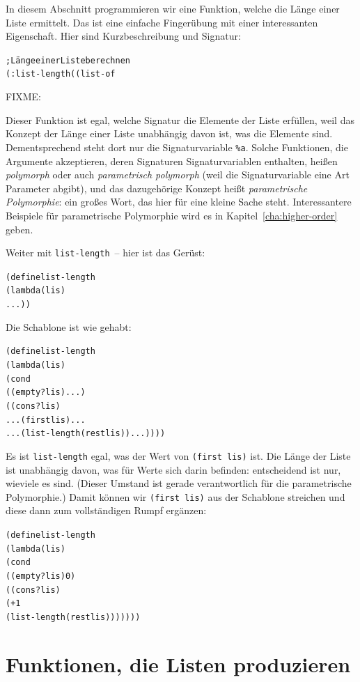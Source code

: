 In diesem Abschnitt programmieren wir eine Funktion, welche die Länge
einer Liste ermittelt. Das ist
eine einfache Fingerübung mit einer interessanten Eigenschaft.  Hier
sind Kurzbeschreibung und Signatur:
%
\begin{alltt}
; Länge einer Liste berechnen
(: list-length ((list-of %
\end{alltt}
%
FIXME:

Dieser Funktion ist egal, welche Signatur
die Elemente der Liste erfüllen, weil das Konzept der Länge einer
Liste unabhängig davon ist, was die Elemente sind.
Dementsprechend steht dort nur die Signaturvariable \verb|%a|.
Solche Funktionen, die Argumente akzeptieren, deren Signaturen
Signaturvariablen enthalten, heißen \textit{polymorph} oder auch
\textit{parametrisch polymorph} (weil die Signaturvariable eine Art
Parameter abgibt), und das dazugehörige Konzept heißt
\textit{parametrische
  Polymorphie}:
ein großes Wort, das hier für eine kleine Sache steht.  Interessantere
Beispiele für parametrische Polymorphie wird es in
Kapitel~\ref{cha:higher-order} geben.

Weiter mit \texttt{list-length}~-- hier ist das Gerüst:
%
\begin{alltt}
(define list-length
  (lambda (lis)
    ...))
\end{alltt}
%
Die Schablone ist wie gehabt:
%
\begin{alltt}
(define list-length
  (lambda (lis)
    (cond
      ((empty? lis) ...)
      ((cons? lis) 
       ... (first lis) ...
       ... (list-length (rest lis)) ...))))
\end{alltt}
%
Es ist \texttt{list-length} egal, was der Wert von \texttt{(first
  lis)} ist.  Die Länge der Liste ist unabhängig davon, was für Werte
sich darin befinden: entscheidend ist nur, wieviele es sind.  (Dieser
Umstand ist gerade verantwortlich für die parametrische Polymorphie.)
Damit können wir \texttt{(first lis)} aus der Schablone streichen und
diese dann zum vollständigen Rumpf ergänzen:
%
\begin{alltt}
(define list-length
  (lambda (lis)
    (cond
      ((empty? lis) 0)
      ((cons? lis) 
       (+ 1 
          (list-length (rest lis)))))))
\end{alltt}
%

\section{Funktionen, die Listen produzieren}

